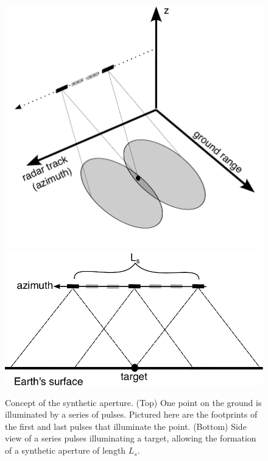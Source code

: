 

\begin{figure}
	\centering
	\includegraphics[width=0.8\linewidth]{figures/chapter3-sar/ch3-synth-aper2.pdf}
	\includegraphics[width=0.99\linewidth]{figures/chapter3-sar/ch3-sar-synthetic-aperture.pdf}
	\caption[Concept of the synthetic aperture ]{Concept of the synthetic aperture.
		(Top) One point on the ground is illuminated by a series of pulses. Pictured here are the footprints of the first and last pulses that illuminate the point. 
		(Bottom) Side view of a series pulses illuminating a target, allowing the formation of a synthetic aperture of length $L_s$.
	}
	\label{fig:ch3-synth-aper}
\end{figure}


